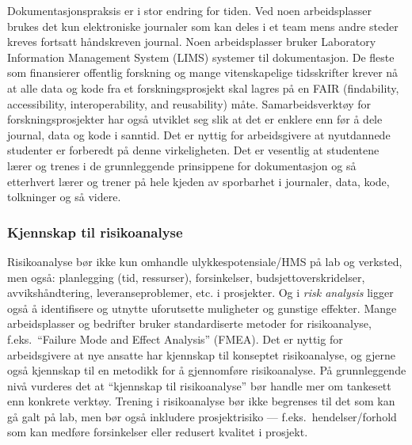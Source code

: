 \documentclass{article}
\begin{document}
Dokumentasjonspraksis er i stor endring for tiden. Ved noen arbeidsplasser brukes det kun elektroniske journaler som kan deles i et team mens andre steder kreves fortsatt håndskreven journal. Noen arbeidsplasser bruker Laboratory Information Management System (LIMS) systemer til dokumentasjon. De fleste som finansierer offentlig forskning og mange vitenskapelige tidsskrifter krever nå at alle data og kode fra et forskningsprosjekt skal lagres på en FAIR (findability, accessibility, interoperability, and reusability) måte. Samarbeidsverktøy for forskningsprosjekter har også utviklet seg slik at det er enklere enn før å dele journal, data og kode i sanntid. Det er nyttig for arbeidsgivere at nyutdannede studenter er forberedt på denne virkeligheten. Det er vesentlig at studentene lærer og trenes i de grunnleggende prinsippene for dokumentasjon og så etterhvert lærer og trener på hele kjeden av sporbarhet i journaler, data, kode, tolkninger og så videre.

\subsubsection{Kjennskap til risikoanalyse}
Risikoanalyse bør ikke kun omhandle ulykkespotensiale/HMS på lab og verksted, men også: planlegging (tid, ressurser), forsinkelser, budsjettoverskridelser,  avvikshåndtering, leveranseproblemer, etc. i prosjekter. Og i \emph{risk analysis} ligger også å identifisere og utnytte uforutsette muligheter og gunstige effekter. Mange arbeidsplasser og bedrifter bruker standardiserte metoder for risikoanalyse, f.eks.~``Failure Mode and Effect Analysis'' (FMEA). Det er nyttig for arbeidsgivere at nye ansatte har kjennskap til konseptet risikoanalyse, og gjerne også kjennskap til en metodikk for å gjennomføre risikoanalyse.
På grunnleggende nivå vurderes det at ``kjennskap til risikoanalyse'' bør handle mer om tankesett enn konkrete verktøy.
Trening i risikoanalyse bør ikke begrenses til det som kan gå galt på lab, men bør også inkludere prosjektrisiko --- f.eks.~hendelser/forhold som kan medføre forsinkelser eller redusert kvalitet i prosjekt.
\end{document}
